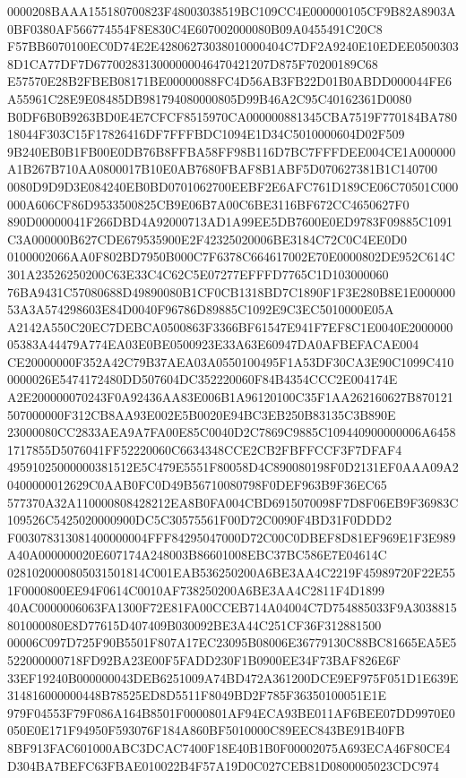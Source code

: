 \documentclass[UTF8,fontset=fandol,zihao=-4,a4paper]{ctexart}
\begin{document}
{{0000208BAAA155180700823F48003038519BC109CC4E000000105CF9B82A8903A0BF0380AF566774554F8E830C4E607002000080B09A0455491C20C8
F57BB6070100EC0D74E2E42806273038010000404C7DF2A9240E10EDEE05003038D1CA77DF7D6770028313000000046470421207D875F70200189C68
E57570E28B2FBEB08171BE00000088FC4D56AB3FB22D01B0ABDD000044FE6A55961C28E9E08485DB981794080000805D99B46A2C95C40162361D0080
B0DF6B0B9263BD0E4E7CFCF8515970CA000000881345CBA7519F770184BA78018044F303C15F17826416DF7FFFBDC1094E1D34C5010000604D02F509
9B240EB0B1FB00E0DB76B8FFBA58FF98B116D7BC7FFFDEE004CE1A000000A1B267B710AA0800017B10E0AB7680FBAF8B1ABF5D070627381B1C140700
0080D9D9D3E084240EB0BD0701062700EEBF2E6AFC761D189CE06C70501C000000A606CF86D9533500825CB9E06B7A00C6BE3116BF672CC4650627F0
890D00000041F266DBD4A92000713AD1A99EE5DB7600E0ED9783F09885C1091C3A000000B627CDE679535900E2F42325020006BE3184C72C0C4EE0D0
0100002066AA0F802BD7950B000C7F6378C664617002E70E0000802DE952C614C301A23526250200C63E33C4C62C5E07277EFFFD7765C1D103000060
76BA9431C57080688D49890080B1CF0CB1318BD7C1890F1F3E280B8E1E00000053A3A574298603E84D0040F96786D89885C1092E9C3EC5010000E05A
A2142A550C20EC7DEBCA0500863F3366BF61547E941F7EF8C1E0040E200000005383A44479A774EA03E0BE0500923E33A63E60947DA0AFBEFACAE004
CE20000000F352A42C79B37AEA03A0550100495F1A53DF30CA3E90C1099C4100000026E5474172480DD507604DC352220060F84B4354CCC2E004174E
A2E200000070243F0A92436AA83E006B1A96120100C35F1AA262160627B870121507000000F312CB8AA93E002E5B0020E94BC3EB250B83135C3B890E
23000080CC2833AEA9A7FA00E85C0040D2C7869C9885C109440900000006A64581717855D5076041FF52220060C6634348CCE2CB2FBFFCCF3F7DFAF4
49591025000000381512E5C479E5551F80058D4C890080198F0D2131EF0AAA09A20400000012629C0AAB0FC0D49B56710080798F0DEF963B9F36EC65
577370A32A110000808428212EA8B0FA004CBD6915070098F7D8F06EB9F36983C109526C5425020000900DC5C30575561F00D72C0090F4BD31F0DDD2
F003078313081400000004FFF84295047000D72C00C0DBEF8D81EF969E1F3E989A40A000000020E607174A248003B86601008EBC37BC586E7E04614C
0281020000805031501814C001EAB536250200A6BE3AA4C2219F45989720F22E551F0000800EE94F0614C0010AF738250200A6BE3AA4C2811F4D1899
40AC0000006063FA1300F72E81FA00CCEB714A04004C7D754885033F9A3038815801000080E8D77615D407409B030092BE3A44C251CF36F312881500
00006C097D725F90B5501F807A17EC23095B08006E36779130C88BC81665EA5E5522000000718FD92BA23E00F5FADD230F1B0900EE34F73BAF826E6F
33EF19240B000000043DEB6251009A74BD472A361200DCE9EF975F051D1E639E314816000000448B78525ED8D5511F8049BD2F785F36350100051E1E
979F04553F79F086A164B8501F0000801AF94ECA93BE011AF6BEE07DD9970E0050E0E171F94950F593076F184A860BF5010000C89EEC843BE91B40FB
8BF913FAC601000ABC3DCAC7400F18E40B1B0F00002075A693ECA46F80CE4D304BA7BEFC63FBAE010022B4F57A19D0C027CEB81D0800005023CDC974
}}
\end{document}

